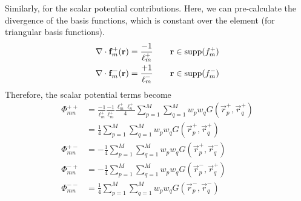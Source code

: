 Similarly, for the scalar potential contributions. Here, we can pre-calculate the divergence of the basis functions, which is constant over the element (for triangular basis functions).
\begin{align}
	\nabla \cdot \mathbf{f}_m^{+}(\mathbf{r}) & = \frac{-1}{\ell_m^+} \qquad \mathbf{r} \in \operatorname{supp}(f_m^+) \\
	\nabla \cdot \mathbf{f}_m^{-}(\mathbf{r}) & = \frac{+1}{\ell_m^-} \qquad \mathbf{r} \in \operatorname{supp}(f_m^-)
\end{align}
Therefore, the scalar potential terms become
\begin{align*}
	\Phi_{mn}^{++} & = \frac{-1}{\ell_{m}^{+}} \frac{-1}{\ell_{m}^{+}} \frac{\ell_m^{+} \ell_n^{+}}{4} \sum_{p = 1}^M \sum_{q = 1}^M w_p w_q G(\vec{r}_p^{+}, \vec{r}_q^{+}) \\
	& = \frac{1}{4} \sum_{p = 1}^M \sum_{q = 1}^M w_p w_q G(\vec{r}_p^{+}, \vec{r}_q^{+}) \\
	\Phi_{mn}^{+-} & = -\frac{1}{4} \sum_{p = 1}^M \sum_{q = 1}^M w_p w_q G(\vec{r}_p^{+}, \vec{r}_q^{-}) \\
	\Phi_{mn}^{-+} & = -\frac{1}{4} \sum_{p = 1}^M \sum_{q = 1}^M w_p w_q G(\vec{r}_p^{-}, \vec{r}_q^{+}) \\
	\Phi_{mn}^{--} & = \frac{1}{4} \sum_{p = 1}^M \sum_{q = 1}^M w_p w_q G(\vec{r}_p^{-}, \vec{r}_q^{-})
\end{align*}


